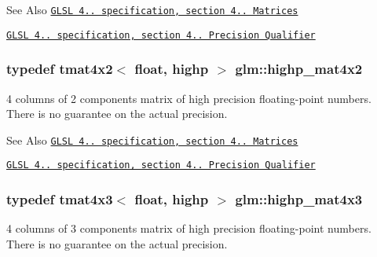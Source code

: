 \begin{DoxySeeAlso}{See Also}
\href{http://www.opengl.org/registry/doc/GLSLangSpec.4.20.8.pdf}{\tt G\-L\-S\-L 4.. specification, section 4.. Matrices} 

\href{http://www.opengl.org/registry/doc/GLSLangSpec.4.20.8.pdf}{\tt G\-L\-S\-L 4.. specification, section 4.. Precision Qualifier} 
\end{DoxySeeAlso}
\hypertarget{group__core__precision_ga289d5d6b112dc6e3f545e7f98d3d0b5c}{
\subsubsection[{highp\-\_\-mat4x2}]{\setlength{\rightskip}{0pt plus 5cm}typedef tmat4x2$<$ float, highp $>$ {\bf glm\-::highp\-\_\-mat4x2}}}\label{group__core__precision_ga289d5d6b112dc6e3f545e7f98d3d0b5c}
4 columns of 2 components matrix of high precision floating-\/point numbers. There is no guarantee on the actual precision.

\begin{DoxySeeAlso}{See Also}
\href{http://www.opengl.org/registry/doc/GLSLangSpec.4.20.8.pdf}{\tt G\-L\-S\-L 4.. specification, section 4.. Matrices} 

\href{http://www.opengl.org/registry/doc/GLSLangSpec.4.20.8.pdf}{\tt G\-L\-S\-L 4.. specification, section 4.. Precision Qualifier} 
\end{DoxySeeAlso}
\hypertarget{group__core__precision_ga549b3b126dfbf5f9fef6b76deb15cb4e}{
\subsubsection[{highp\-\_\-mat4x3}]{\setlength{\rightskip}{0pt plus 5cm}typedef tmat4x3$<$ float, highp $>$ {\bf glm\-::highp\-\_\-mat4x3}}}\label{group__core__precision_ga549b3b126dfbf5f9fef6b76deb15cb4e}
4 columns of 3 components matrix of high precision floating-\/point numbers. There is no guarantee on the actual precision.


